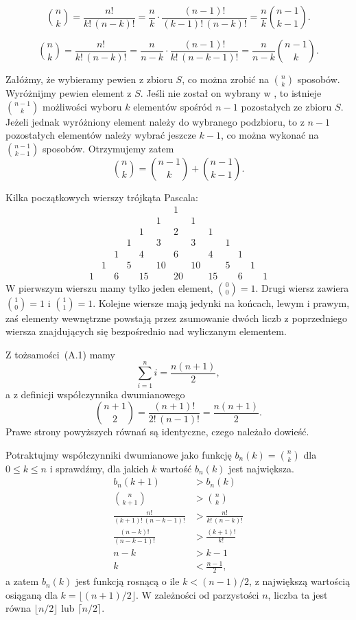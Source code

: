 \exercise{} %
\[
	\binom{n}{k} = \frac{n!}{k!\,(n-k)!} = \frac{n}{k}\cdot\frac{(n-1)!}{(k-1)!\,(n-k)!} = \frac{n}{k}\binom{n-1}{k-1}.
\]

\exercise{} %
\[
	\binom{n}{k} = \frac{n!}{k!\,(n-k)!} = \frac{n}{n-k}\cdot\frac{(n-1)!}{k!\,(n-k-1)!} = \frac{n}{n-k}\binom{n-1}{k}.
\]

\exercise{} %
\noindent Załóżmy, że wybieramy pewien  z  zbioru $S$, co można zrobić na $\binom{n}{k}$ sposobów. Wyróżnijmy pewien element z $S$. Jeśli nie został on wybrany w , to istnieje $\binom{n-1}{k}$ możliwości wyboru $k$ elementów spośród $n-1$ pozostałych ze zbioru $S$. Jeżeli jednak wyróżniony element należy do wybranego podzbioru, to z $n-1$ pozostałych elementów należy wybrać jeszcze $k-1$, co można wykonać na $\binom{n-1}{k-1}$ sposobów. Otrzymujemy zatem
\[
	\binom{n}{k} = \binom{n-1}{k}+\binom{n-1}{k-1}.
\]

\exercise{} %
\noindent Kilka początkowych wierszy trójkąta Pascala:
\[
	\begin{array}{ccccccccccccc}
		&&&&&& 1 \\
		&&&&& 1 && 1 \\
		&&&& 1 && 2 && 1 \\
		&&& 1 && 3 && 3 && 1 \\
		&& 1 && 4 && 6 && 4 && 1 \\
		& 1 && 5 && 10 && 10 && 5 && 1 \\
		1 && 6 && 15 && 20 && 15 && 6 && 1
	\end{array}
\]
W pierwszym wierszu mamy tylko jeden element, $\binom{0}{0}=1$. Drugi wiersz zawiera $\binom{1}{0}=1$ i $\binom{1}{1}=1$. Kolejne wiersze mają jedynki na końcach, lewym i prawym, zaś elementy wewnętrzne powstają przez zsumowanie dwóch liczb z poprzedniego wiersza znajdujących się bezpośrednio nad wyliczanym elementem.

\exercise{} %
\noindent Z tożsamości~(A.1) mamy
\[
	\sum_{i=1}^ni = \frac{n(n+1)}{2},
\]
a z definicji współczynnika dwumianowego
\[
	\binom{n+1}{2} = \frac{(n+1)!}{2!\,(n-1)!} = \frac{n(n+1)}{2}.
\]
Prawe strony powyższych równań są identyczne, czego należało dowieść.

\exercise{} %
\noindent Potraktujmy współczynniki dwumianowe jako funkcję $b_n(k)=\binom{n}{k}$ dla $0\le k\le n$ i sprawdźmy, dla jakich $k$ wartość $b_n(k)$ jest największa.
\begin{align*}
	b_n(k+1) &> b_n(k) \\
	\binom{n}{k+1} &> \binom{n}{k} \\
	\frac{n!}{(k+1)!\,(n-k-1)!} &> \frac{n!}{k!\,(n-k)!} \\
	\frac{(n-k)!}{(n-k-1)!} &> \frac{(k+1)!}{k!} \\
	n-k &> k-1 \\
	k &< \frac{n-1}{2},
\end{align*}
a zatem $b_n(k)$ jest funkcją rosnącą o ile $k<(n-1)/2$, z największą wartością osiąganą dla $k=\lfloor(n+1)/2\rfloor$. W zależności od parzystości $n$, liczba ta jest równa $\lfloor n/2\rfloor$ lub $\lceil n/2\rceil$.

